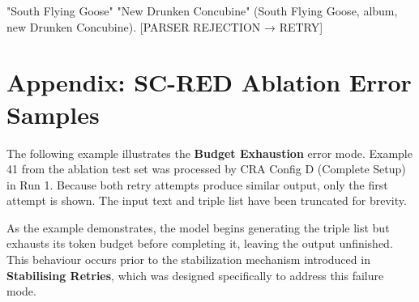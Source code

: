\begin{appendices}
\begin{tcolorbox}[tracebox, title=Model Reasoning Trace (from Finish action onward)]
  "South Flying Goose" "New Drunken Concubine"
  (South Flying Goose, album, new Drunken Concubine).
                                                    [PARSER REJECTION → RETRY]
\end{tcolorbox}

\chapter{Appendix: SC-RED Ablation Error Samples}
\label{app:scred_error_samples}

The following example illustrates the \textbf{Budget Exhaustion}
error mode. Example 41 from the ablation test set was processed by
CRA Config D (Complete Setup) in Run 1. Because both retry attempts
produce similar output, only the first attempt is shown. The input
text and triple list have been truncated for brevity.

As the example demonstrates, the model begins generating the triple
list but exhausts its token budget before completing it, leaving the
output unfinished. This behaviour occurs prior to the stabilization
mechanism introduced in \textbf{Stabilising Retries}, which was
designed specifically to address this failure mode.


\end{appendices}
